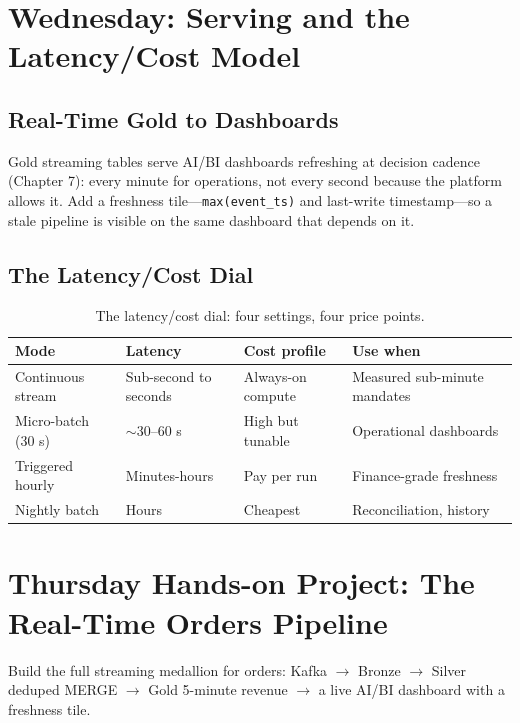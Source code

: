 \section{Wednesday: Serving and the Latency/Cost Model}
\subsection{Real-Time Gold to Dashboards}
Gold streaming tables serve AI/BI dashboards refreshing at decision cadence (Chapter 7): every minute for operations, not every second because the platform allows it. Add a freshness tile---\texttt{max(event\_ts)} and last-write timestamp---so a stale pipeline is visible on the same dashboard that depends on it.

\subsection{The Latency/Cost Dial}
\begin{table}[H]
\centering
\small
\begin{tabular}{@{}p{3.4cm}p{3.6cm}p{3.4cm}p{2.6cm}@{}}
\toprule
\textbf{Mode} & \textbf{Latency} & \textbf{Cost profile} & \textbf{Use when} \\
\midrule
Continuous stream & Sub-second to seconds & Always-on compute & Measured sub-minute mandates \\
Micro-batch (30 s) & $\sim$30--60 s & High but tunable & Operational dashboards \\
Triggered hourly & Minutes-hours & Pay per run & Finance-grade freshness \\
Nightly batch & Hours & Cheapest & Reconciliation, history \\
\bottomrule
\end{tabular}
\caption{The latency/cost dial: four settings, four price points.}
\label{tab:ch16-latency}
\end{table}

\section{Thursday Hands-on Project: The Real-Time Orders Pipeline}
Build the full streaming medallion for orders: Kafka $\rightarrow$ Bronze $\rightarrow$ Silver deduped MERGE $\rightarrow$ Gold 5-minute revenue $\rightarrow$ a live AI/BI dashboard with a freshness tile.

